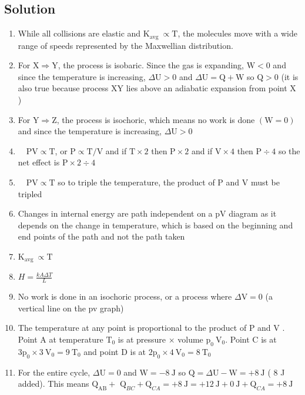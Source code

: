 \begin{enumerate}
\section*{Solution}
\begin{enumerate}
  \item While all collisions are elastic and $\mathrm{K}_{\text {avg }} \propto \mathrm{T}$, the molecules move with a wide range of speeds represented by the Maxwellian distribution.
  \item For $\mathrm{X} \Rightarrow \mathrm{Y}$, the process is isobaric. Since the gas is expanding, $\mathrm{W}<0$ and since the temperature is increasing, $\Delta \mathrm{U}>0$ and $\Delta \mathrm{U}=\mathrm{Q}+\mathrm{W}$ so $\mathrm{Q}>0$ (it is also true because process XY lies above an adiabatic expansion from point X )
  \item For $\mathrm{Y} \Rightarrow \mathrm{Z}$, the process is isochoric, which means no work is done $(\mathrm{W}=0)$ and since the temperature is increasing, $\Delta \mathrm{U}>0$
  \item $\quad \mathrm{PV} \propto \mathrm{T}$, or $\mathrm{P} \propto \mathrm{T} / \mathrm{V}$ and if $\mathrm{T} \times 2$ then $\mathrm{P} \times 2$ and if $\mathrm{V} \times 4$ then $\mathrm{P} \div 4$ so the net effect is $\mathrm{P} \times 2 \div 4$
  \item $\quad \mathrm{PV} \propto \mathrm{T}$ so to triple the temperature, the product of P and V must be tripled
  \item Changes in internal energy are path independent on a pV diagram as it depends on the change in temperature, which is based on the beginning and end points of the path and not the path taken
  \item $\mathrm{K}_{\text {avg }} \propto \mathrm{T}$
  \item $H=\frac{k A \Delta T}{L}$
  \item No work is done in an isochoric process, or a process where $\Delta \mathrm{V}=0$ (a vertical line on the pv graph)
  \item The temperature at any point is proportional to the product of P and V . Point A at temperature $\mathrm{T}_{0}$ is at pressure $\times$ volume $\mathrm{p}_{0} \mathrm{~V}_{0}$. Point C is at $3 \mathrm{p}_{0} \times 3 \mathrm{~V}_{0}=9 \mathrm{~T}_{0}$ and point D is at $2 \mathrm{p}_{0} \times 4 \mathrm{~V}_{0}=8 \mathrm{~T}_{0}$
  \item For the entire cycle, $\Delta \mathrm{U}=0$ and $\mathrm{W}=-8 \mathrm{~J}$ so $\mathrm{Q}=\Delta \mathrm{U}-\mathrm{W}=+8 \mathrm{~J}$ ( 8 J added). This means $\mathrm{Q}_{\mathrm{AB}}+$ $\mathrm{Q}_{B C}+\mathrm{Q}_{C A}=+8 \mathrm{~J}=+12 \mathrm{~J}+0 \mathrm{~J}+\mathrm{Q}_{C A}=+8 \mathrm{~J}$

\end{enumerate}
\end{enumerate}
